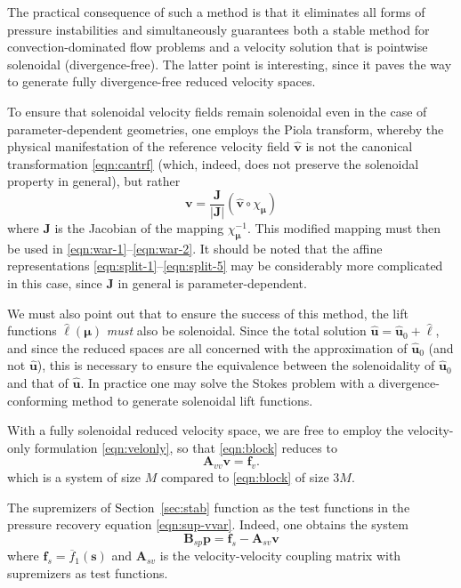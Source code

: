 \documentclass[onecolumn, twoside, a4paper, 11pt]{article}
\begin{document}
The practical consequence of such a method is that it eliminates all forms of
pressure instabilities and simultaneously guarantees both a stable method for
convection-dominated flow problems and a velocity solution that is pointwise
solenoidal (divergence-free). The latter point is interesting, since it paves
the way to generate fully divergence-free reduced velocity spaces.

To ensure that solenoidal velocity fields remain solenoidal even in the case of
parameter-dependent geometries, one employs the Piola transform, whereby the
physical manifestation of the reference velocity field $\hat{\bm v}$ is not the
canonical transformation \eqref{eqn:cantrf} (which, indeed, does not
preserve the solenoidal property in general), but rather
\begin{equation}
  \label{eqn:piola}
  \bm v = \frac{\bm J}{|\bm J|} (\hat{\bm v} \circ \chi_{\bm\mu})
\end{equation}
where $\bm J$ is the Jacobian of the mapping $\chi_{\bm \mu}^{-1}$. This modified
mapping must then be used in \eqref{eqn:war-1}--\eqref{eqn:war-2}. It should be
noted that the affine representations \eqref{eqn:split-1}--\eqref{eqn:split-5}
may be considerably more complicated in this case, since $\bm J$ in general is
parameter-dependent.

We must also point out that to ensure the success of this method, the lift
functions $\hat{\bm \ell}(\bm \mu)$ \emph{must} also be solenoidal. Since the total
solution $\hat{\bm u} = \hat{\bm u}_0 + \hat{\bm \ell}$, and since the reduced spaces are all
concerned with the approximation of $\hat{\bm u}_0$ (and not $\hat{\bm u}$), this is
necessary to ensure the equivalence between the solenoidality of $\hat{\bm u}_0$ and
that of $\hat{\bm u}$. In practice one may solve the Stokes problem with a
divergence-conforming method to generate solenoidal lift functions.

With a fully solenoidal reduced velocity space, we are free to employ the
velocity-only formulation \eqref{eqn:velonly}, so that \eqref{eqn:block} reduces
to
\begin{equation}
  \bm A_{vv} \bm v = \bm f_v.
  \label{eqn:blocksolve-1}
\end{equation}
which is a system of size $M$ compared to \eqref{eqn:block} of size $3M$.

The supremizers of Section~\ref{sec:stab} function as the test functions in the
pressure recovery equation \eqref{eqn:sup-vvar}. Indeed, one obtains the system
\begin{equation}
  \bm B_{sp} \bm p = \bm f_s - \bm A_{sv} \bm v
  \label{eqn:blocksolve-2}
\end{equation}
where $\bm f_s = \overline{f}_1(\bm s)$ and $\bm A_{sv}$ is the
velocity-velocity coupling matrix with supremizers as test functions.
\end{document}
